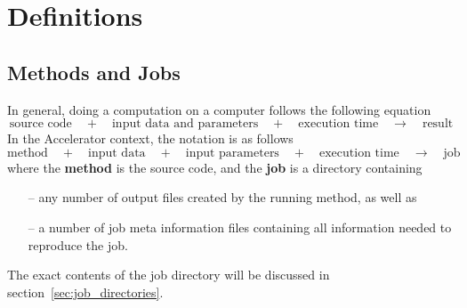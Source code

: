 







\section{Definitions}

\subsection{Methods and Jobs}

In general, doing a computation on a computer follows the following
equation
\[
  \text{source code} \quad+\quad \text{input data and parameters}
  \quad+\quad \text{execution time} \quad\rightarrow\quad
  \text{result}
\]
In the Accelerator context, the notation is as follows
\[
  \text{method} \quad+\quad \text{input data} \quad+\quad \text{input
    parameters} \quad+\quad \text{execution time}
  \quad\rightarrow\quad \text{job}
\]
where the \textbf{method} is the source code, and the \textbf{job} is
a directory containing
\begin{itemize}
\item[--] any number of output files created by the running method, as well as
\item[--] a number of job meta information files containing all
  information needed to reproduce the job.
\end{itemize}
The exact contents of the job directory will be discussed in
section~\ref{sec:job_directories}.

